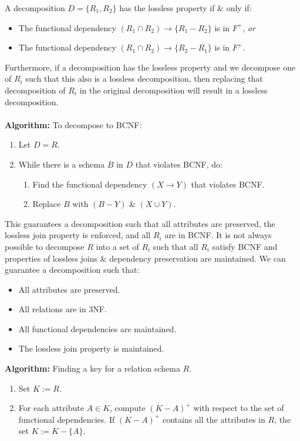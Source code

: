 \documentclass[a4paper,11pt]{article}
\begin{document}
A decomposition $D = \{R_1, R_2\}$ has the lossless property if \& only if:
\begin{itemize}
    \item   The functional dependency $(R_1 \cap R_2) \rightarrow \{R_1 - R_2\}$ is in $F^+$, \emph{or}
    \item   The functional dependency $(R_1 \cap R_2) \rightarrow \{R_2 - R_1\}$ is in $F^+$.
\end{itemize}

Furthermore, if a decomposition has the lossless property and we decompose one of $R_i$ such that this also is a lossless 
decomposition, then replacing that decomposition of $R_i$ in the original decomposition will result in a lossless 
decomposition.
\\\\ 
\textbf{Algorithm:} To decompose to BCNF:
\begin{enumerate}
    \item   Let $D = R$.
    \item   While there is a schema $B$ in $D$ that violates BCNF, do:
            \begin{enumerate}
                \item   Find the functional dependency $(X \rightarrow Y)$ that violates BCNF.
                \item   Replace $B$ with $(B-Y)$ \& $(X \cup Y)$.
            \end{enumerate}
\end{enumerate}

This guarantees a decomposition such that all attributes are preserved, the lossless join property is enforced, 
and all $R_i$ are in BCNF.
It is not always possible to decompose $R$ into a set of $R_i$ such that all $R_i$ satisfy BCNF and properties 
of lossless joins \& dependency preservation are maintained.
We can guarantee a decomposition such that:
\begin{itemize}
    \item   All attributes are preserved.
    \item   All relations are in 3NF.
    \item   All functional dependencies are maintained. 
    \item   The lossless join property is maintained.
\end{itemize}

\textbf{Algorithm:} Finding a key for a relation schema $R$.
\begin{enumerate}
    \item   Set $K := R$.
    \item   For each attribute $A \in K$, compute $(K-A)^+$ with respect to the set of functional dependencies.
            If $(K-A)^+$ contains all the attributes in $R$, the set $K := K - \{A\}$.
\end{enumerate}
\end{document}
